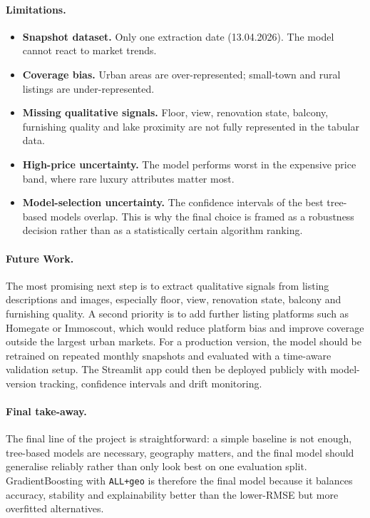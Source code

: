 \documentclass[11pt,a4paper]{article}
\begin{document}
\paragraph{Limitations.}
\begin{itemize}
    \item \textbf{Snapshot dataset.} Only one extraction date (13.04.2026). The model cannot react to market trends.
    \item \textbf{Coverage bias.} Urban areas are over-represented; small-town and rural listings are under-represented.
    \item \textbf{Missing qualitative signals.} Floor, view, renovation state, balcony, furnishing quality and lake proximity are not fully represented in the tabular data.
    \item \textbf{High-price uncertainty.} The model performs worst in the expensive price band, where rare luxury attributes matter most.
    \item \textbf{Model-selection uncertainty.} The confidence intervals of the best tree-based models overlap. This is why the final choice is framed as a robustness decision rather than as a statistically certain algorithm ranking.
\end{itemize}

\paragraph{Future Work.}
The most promising next step is to extract qualitative signals from listing descriptions and images, especially floor, view, renovation state, balcony and furnishing quality. A second priority is to add further listing platforms such as Homegate or Immoscout, which would reduce platform bias and improve coverage outside the largest urban markets. For a production version, the model should be retrained on repeated monthly snapshots and evaluated with a time-aware validation setup. The Streamlit app could then be deployed publicly with model-version tracking, confidence intervals and drift monitoring.

\paragraph{Final take-away.}
The final line of the project is straightforward: a simple baseline is not enough, tree-based models are necessary, geography matters, and the final model should generalise reliably rather than only look best on one evaluation split. GradientBoosting with \texttt{ALL+geo} is therefore the final model because it balances accuracy, stability and explainability better than the lower-RMSE but more overfitted alternatives.
\end{document}
